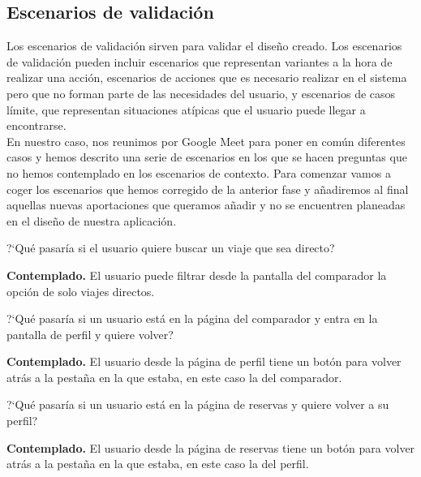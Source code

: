 \subsection{Escenarios de validación}
Los escenarios de validación sirven para validar el diseño creado. Los escenarios de validación pueden incluir escenarios que representan variantes a la hora de 
realizar una acción, escenarios de acciones que es necesario realizar en el sistema pero que no forman parte de las necesidades del usuario, y escenarios de 
casos límite, que representan situaciones atípicas que el usuario puede llegar a encontrarse. \\

En nuestro caso, nos reunimos por Google Meet para poner en común diferentes casos y hemos descrito una serie de escenarios en los que se hacen preguntas 
que no hemos contemplado en los escenarios de contexto. Para comenzar vamos a coger los escenarios que hemos corregido de la anterior fase y añadiremos al final aquellas
nuevas aportaciones que queramos añadir y no se encuentren planeadas en el diseño de nuestra aplicación.

\begin{escenario} %
    \centering
    ?`Qué pasaría si el usuario quiere buscar un viaje que sea directo?

    \begin{solucion}
        \centering
        \textbf{Contemplado.} El usuario puede filtrar desde la pantalla del comparador la opción de solo viajes directos.
    \end{solucion}
\end{escenario}


\begin{escenario}
    \centering
    ?`Qué pasaría si un usuario está en la página del comparador y entra en la pantalla de perfil y quiere volver?

    \begin{solucion}
        \centering
        \textbf{Contemplado.} El usuario desde la página de perfil tiene un botón para volver atrás a la pestaña en la que estaba, en este caso la del comparador.
    \end{solucion}
\end{escenario}

\begin{escenario}
    \centering
    ?`Qué pasaría si un usuario está en la página de reservas y quiere volver a su perfil?

    \begin{solucion}
        \centering
        \textbf{Contemplado.} El usuario desde la página de reservas tiene un botón para volver atrás a la pestaña en la que estaba, en este caso la del perfil.
    \end{solucion}
\end{escenario}


